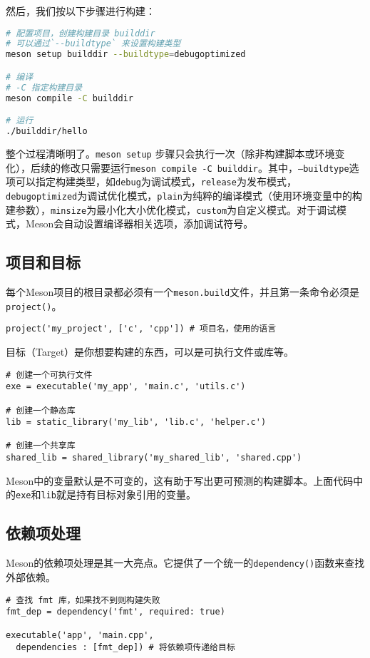 \documentclass[../main.tex]{subfiles}
\begin{document}
然后，我们按以下步骤进行构建：
\begin{lstlisting}[language=bash]
# 配置项目，创建构建目录 builddir
# 可以通过`--buildtype` 来设置构建类型
meson setup builddir --buildtype=debugoptimized

# 编译
# -C 指定构建目录
meson compile -C builddir

# 运行
./builddir/hello
\end{lstlisting}

整个过程清晰明了。\texttt{meson setup} 步骤只会执行一次（除非构建脚本或环境变化），后续的修改只需要运行\texttt{meson compile -C builddir}。其中，\texttt{--buildtype}选项可以指定构建类型，如\texttt{debug}为调试模式，\texttt{release}为发布模式，\texttt{debugoptimized}为调试优化模式，\texttt{plain}为纯粹的编译模式（使用环境变量中的构建参数），\texttt{minsize}为最小化大小优化模式，\texttt{custom}为自定义模式。对于调试模式，Meson会自动设置编译器相关选项，添加调试符号。

\subsection{项目和目标}
每个Meson项目的根目录都必须有一个\texttt{meson.build}文件，并且第一条命令必须是\texttt{project()}。
\begin{lstlisting}
project('my_project', ['c', 'cpp']) # 项目名，使用的语言
\end{lstlisting}

目标（Target）是你想要构建的东西，可以是可执行文件或库等。
\begin{lstlisting}
# 创建一个可执行文件
exe = executable('my_app', 'main.c', 'utils.c')

# 创建一个静态库
lib = static_library('my_lib', 'lib.c', 'helper.c')

# 创建一个共享库
shared_lib = shared_library('my_shared_lib', 'shared.cpp')
\end{lstlisting}

Meson中的变量默认是不可变的，这有助于写出更可预测的构建脚本。上面代码中的\texttt{exe}和\texttt{lib}就是持有目标对象引用的变量。

\subsection{依赖项处理}
Meson的依赖项处理是其一大亮点。它提供了一个统一的\texttt{dependency()}函数来查找外部依赖。
\begin{lstlisting}
# 查找 fmt 库，如果找不到则构建失败
fmt_dep = dependency('fmt', required: true)

executable('app', 'main.cpp',
  dependencies : [fmt_dep]) # 将依赖项传递给目标
\end{lstlisting}
\end{document}
